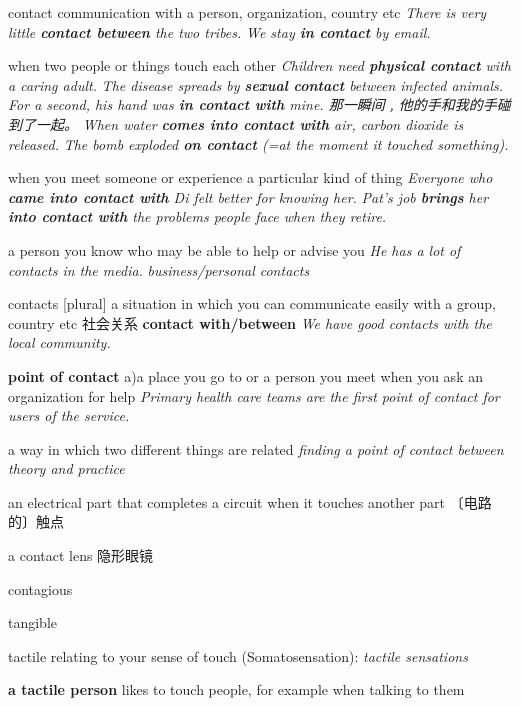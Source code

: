 \begin{DefWord}{contact}
    communication with a person, organization, country etc
    \textit{There is very little \textbf{contact between} the two tribes.}
    \textit{We stay \textbf{in contact} by email.}

    when two people or things touch each other
    \textit{Children need \textbf{physical contact} with a caring adult.}
    \textit{The disease spreads by \textbf{sexual contact} between infected animals.}
    \textit{For a second, his hand was \textbf{in contact with} mine. 那一瞬间﹐他的手和我的手碰到了一起。}
    \textit{When water \textbf{comes into contact with} air, carbon dioxide is released.}
    \textit{The bomb exploded \textbf{on contact} (=at the moment it touched something).}

    when you meet someone or experience a particular kind of thing
    \textit{Everyone who \textbf{came into contact with} Di felt better for knowing her.}
    \textit{Pat’s job \textbf{brings} her \textbf{into contact with} the problems people face when they retire.}

    a person you know who may be able to help or advise you
    \textit{He has a lot of contacts in the media.}
    \textit{business/personal contacts}

    contacts [plural] a situation in which you can communicate easily with a group, country etc 社会关系
    \textbf{contact with/between}
    \textit{We have good contacts with the local community.}

    \textbf{point of contact}
    a)a place you go to or a person you meet when you ask an organization for help
    \textit{Primary health care teams are the first point of contact for users of the service.}

    a way in which two different things are related
    \textit{finding a point of contact between theory and practice}

    an electrical part that completes a circuit when it touches another part 〔电路的〕触点

    a contact lens 隐形眼镜
\end{DefWord}

\begin{DefWord}{contagious}
\end{DefWord}

\begin{DefWord}{tangible}
\end{DefWord}

\begin{DefWord}{tactile}
    relating to your sense of touch (Somatosensation):
    \textit{tactile sensations}
    
    \textbf{a tactile person} likes to touch people, for example when talking to them

\end{DefWord}


